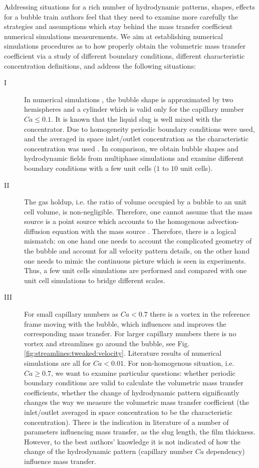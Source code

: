 \documentclass{article}
\begin{document}
Addressing situations for a rich number of hydrodynamic patterns, shapes, effects for a bubble train authors feel that they need to examine more carefully the strategies and assumptions which stay behind the mass transfer coefficient numerical simulations measurements. We aim at establishing numerical simulations procedures as to how properly obtain the volumetric
mass transfer coefficient via a study of different boundary conditions, different characteristic concentration definitions, and address the following situations:
\begin{description}
\item[I] In numerical simulations \cite{vanbaten-circular,kreutzer-overview}, the bubble shape is approximated by two hemispheres and a cylinder which is valid only for the capillary number $Ca\leq 0.1$. It is known \cite{kreutzer-overview} that the liquid slug is well mixed with the concentrator. Due to homogeneity periodic boundary conditions were used, and the averaged in space inlet/outlet concentration as the characteristic concentration was used \cite{vanbaten-circular}. In comparison, we obtain bubble shapes and hydrodynamic fields from multiphase simulations \cite{kuzmin-binary2d,kuzmin-binary3d} and examine different boundary conditions with a few unit cells ($1$ to $10$ unit cells). 
\item[II] The gas holdup, i.e. the ratio of volume occupied by a bubble to an unit cell volume, is
non-negligible. Therefore, one cannot assume that the mass source is a point source which accounts
to the homogenous advection-diffusion equation with the mass source \cite{jos-mass}.  Therefore, there is a logical
mismatch: on one hand one needs to account the complicated geometry of the bubble and account for
all velocity pattern details, on the other hand one needs to mimic the continuous picture which is
seen in experiments. Thus, a few unit cells simulations are performed and compared with one unit cell simulations to bridge different scales.
\item[III] For small capillary numbers as $Ca<0.7$ \cite{giavedoni-numerical} there is a vortex in
the reference frame moving with
the bubble, which  influences and improves the corresponding mass transfer.  For larger capillary
numbers there is no vortex and streamlines go around the bubble, see Fig.
\ref{fig:streamlines:tweaked:velocity}. Literature results of numerical simulations \cite{kreutzer-overview,vanbaten-circular} are all for $Ca<0.01$.  For non-homogenous situation, i.e. $Ca\geq 0.7$, we want to examine particular questions: whether periodic boundary conditions are valid to calculate the volumetric mass transfer coefficients, whether the change of hydrodynamic pattern significantly changes the way we measure the volumetric mass transfer coefficient (the inlet/outlet averaged in space concentration to be the characteristic concentration).  There is the indication in literature \cite{bercic-mass,yue-mass} of a number of parameters influencing mass transfer, as the slug length, the film thickness. However, to the best authors' knowledge it is not indicated of how the change of the hydrodynamic pattern (capillary number $Ca$ dependency) influence mass transfer. 
\end{description}
\end{document}
